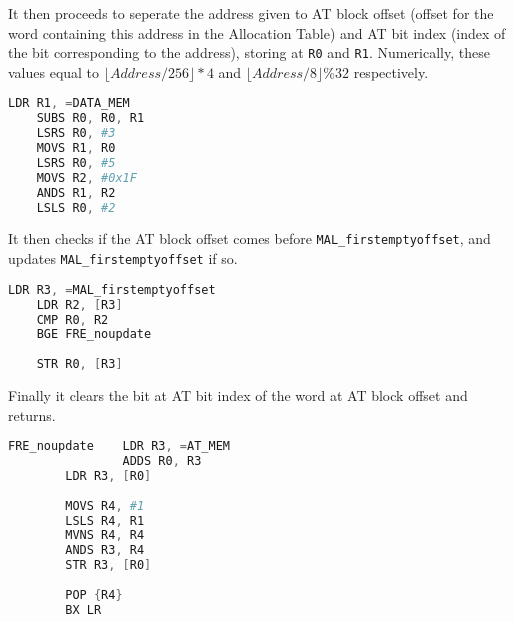\documentclass[pdftex,12pt,a4paper]{article}
\begin{document}
It then proceeds to seperate the address given to AT block offset (offset for the word containing this address in the Allocation Table) and AT bit index (index of the bit corresponding to the address), storing at \verb|R0| and \verb|R1|. Numerically, these values equal to \( \lfloor Address / 256 \rfloor * 4 \) and \( \lfloor Address / 8 \rfloor \% 32 \) respectively.

\begin{lstlisting}[language=Assembler]
        LDR R1, =DATA_MEM
	SUBS R0, R0, R1
	LSRS R0, #3
	MOVS R1, R0
	LSRS R0, #5
	MOVS R2, #0x1F
	ANDS R1, R2
	LSLS R0, #2
\end{lstlisting}

It then checks if the AT block offset comes before \verb|MAL_firstemptyoffset|, and updates \verb|MAL_firstemptyoffset| if so.

\begin{lstlisting}[language=Assembler]
        LDR R3, =MAL_firstemptyoffset
	LDR R2, [R3]
	CMP R0, R2
	BGE	FRE_noupdate
	
	STR R0, [R3]
\end{lstlisting}

Finally it clears the bit at AT bit index of the word at AT block offset and returns.

\begin{lstlisting}[language=Assembler]
FRE_noupdate	LDR R3, =AT_MEM
                ADDS R0, R3
		LDR R3, [R0]
		
		MOVS R4, #1
		LSLS R4, R1
		MVNS R4, R4
		ANDS R3, R4
		STR R3, [R0]
		
		POP {R4}
		BX LR
\end{lstlisting}
\newpage
\end{document}
